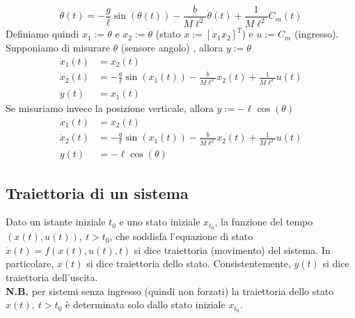 \documentclass{article}
\begin{document}
\[
    \ddot \theta(t) = -\frac{g}{\ell} \sin \left(\theta(t)\right) - \frac{b}{M \ell^2} \dot \theta(t) + \frac{1}{M \ell^2} C_m(t)
\]
Definiamo quindi $x_1 := \theta$ e $x_2 := \dot \theta$ (stato $x:= [x_1x_2]^T$) e $u := C_m$ (ingresso).\\
Supponiamo di misurare $\theta$ (sensore angolo) , allora $y := \theta$
\begin{align*}
    \dot x_1 (t) &= x_2(t)\\
    \dot x_2(t) &= -\frac{g}{\ell} \sin \left(x_1(t)\right) - \frac{b}{M \ell^2} x_2(t) + \frac{1}{M \ell^2} u(t)\\
    y(t) &= x_1(t)
\end{align*}
Se misuriamo invece la posizione verticale, allora $y := - \ell \cos(\theta)$ 
\begin{align*}
    \dot x_1 (t) &= x_2(t)\\
    \dot x_2(t) &= -\frac{g}{\ell} \sin \left(x_1(t)\right) - \frac{b}{M \ell^2} x_2(t) + \frac{1}{M \ell^2} u(t)\\
    y(t) &= - \ell \cos(\theta)
\end{align*}



\subsection{Traiettoria di un sistema}
Dato un istante iniziale $t_0$ e uno stato iniziale $x_{t_0}$, la funzione del tempo $(x(t), u(t)), \ t>t_0$, che soddisfa l'equazione di stato $\dot x(t) = f (x(t), u(t), t)$ si dice traiettoria (movimento) del sistema. In particolare, $x(t)$ si dice traiettoria dello stato. Consistentemente, $y(t)$ si dice traiettoria dell'uscita.
\vspace*{0.2cm}\\
\textbf{N.B.} per sistemi senza ingresso (quindi non forzati) la traiettoria dello stato $x(t), \ t>t_0$ è determinata solo dallo stato iniziale $x_{t_0}$.
\end{document}
